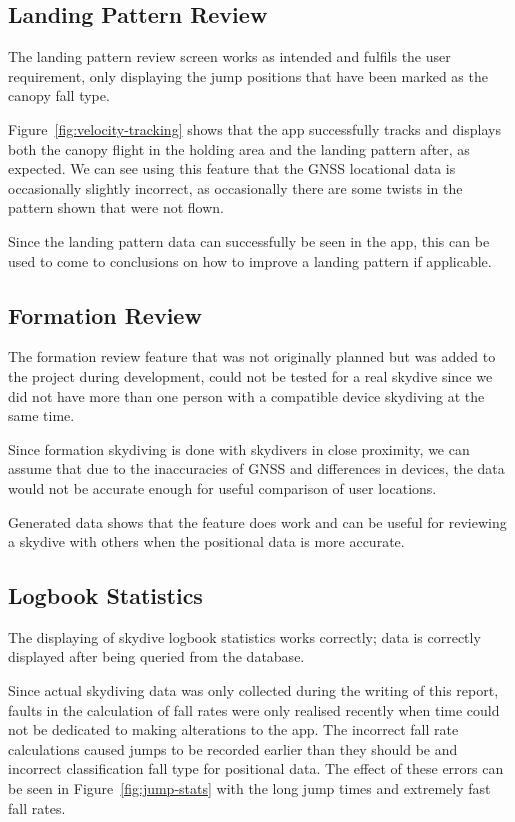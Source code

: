 \subsection{Landing Pattern Review}
The landing pattern review screen works as intended and fulfils the user requirement, only displaying the jump positions that have been marked as the canopy fall type.

Figure~\vref{fig:velocity-tracking} shows that the app successfully tracks and displays both the canopy flight in the holding area and the landing pattern after, as expected. We can see using this feature that the GNSS locational data is occasionally slightly incorrect, as occasionally there are some twists in the pattern shown that were not flown.

Since the landing pattern data can successfully be seen in the app, this can be used to come to conclusions on how to improve a landing pattern if applicable.

\subsection{Formation Review}
The formation review feature that was not originally planned but was added to the project during development, could not be tested for a real skydive since we did not have more than one person with a compatible device skydiving at the same time.

Since formation skydiving is done with skydivers in close proximity, we can assume that due to the inaccuracies of GNSS and differences in devices, the data would not be accurate enough for useful comparison of user locations.

Generated data shows that the feature does work and can be useful for reviewing a skydive with others when the positional data is more accurate.

\subsection{Logbook Statistics}
The displaying of skydive logbook statistics works correctly; data is correctly displayed after being queried from the database.

Since actual skydiving data was only collected during the writing of this report, faults in the calculation of fall rates were only realised recently when time could not be dedicated to making alterations to the app. The incorrect fall rate calculations caused jumps to be recorded earlier than they should be and incorrect classification fall type for positional data. The effect of these errors can be seen in Figure~\vref{fig:jump-stats} with the long jump times and extremely fast fall rates.

